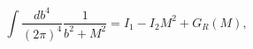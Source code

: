 \begin{equation}
    \int \frac{db^{4}}{(2\pi)^{4}}\frac{1}{b^{2}+M^{2}}=I_{1}-I_{2}M^{2}+G_{R}(M),
\end{equation}


